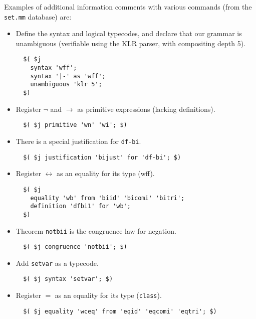 Examples of additional information comments with various commands
(from the \texttt{set.mm} database) are:

\begin{itemize}
   \item Define the syntax and logical typecodes,
     and declare that our grammar is
     unambiguous (verifiable using the KLR parser, with compositing depth 5).
\begin{verbatim}
  $( $j
    syntax 'wff';
    syntax '|-' as 'wff';
    unambiguous 'klr 5';
  $)
\end{verbatim}

   \item Register $\lnot$ and $\rightarrow$ as primitive expressions
           (lacking definitions).
\begin{verbatim}
  $( $j primitive 'wn' 'wi'; $)
\end{verbatim}

   \item There is a special justification for \texttt{df-bi}.
\begin{verbatim}
  $( $j justification 'bijust' for 'df-bi'; $)
\end{verbatim}

   \item Register $\leftrightarrow$ as an equality for its type (wff).
\begin{verbatim}
  $( $j
    equality 'wb' from 'biid' 'bicomi' 'bitri';
    definition 'dfbi1' for 'wb';
  $)
\end{verbatim}

   \item Theorem \texttt{notbii} is the congruence law for negation.
\begin{verbatim}
  $( $j congruence 'notbii'; $)
\end{verbatim}

   \item Add \texttt{setvar} as a typecode.
\begin{verbatim}
  $( $j syntax 'setvar'; $)
\end{verbatim}

   \item Register $=$ as an equality for its type (\texttt{class}).
\begin{verbatim}
  $( $j equality 'wceq' from 'eqid' 'eqcomi' 'eqtri'; $)
\end{verbatim}

\end{itemize}


